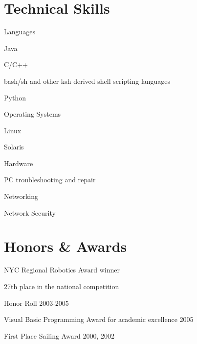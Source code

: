 \documentclass[margin,line]{resume}
\begin{document}
\begin{resume}
\section{\mysidestyle Technical Skills}
	\begin{compactdesc}
		\item[Languages] \ 
		\small
		\begin{compactitem}
			\item Java
			\item C/C++
			\item bash/sh and other ksh derived shell scripting languages
			\item Python
		\end{compactitem}
		\normalsize
		\item[Operating Systems] \ 
		\small
		\begin{compactitem}
			\item Linux
			\item Solaris
		\end{compactitem}
		\normalsize
		\item[Hardware] \ 
		\small
		\begin{compactitem}
			\item PC troubleshooting and repair
			\item Networking
			\item Network Security
		\end{compactitem}
		\normalsize
	\end{compactdesc}

\section{\mysidestyle Honors \& Awards}
	\begin{asparablank}
		\item NYC Regional Robotics Award winner
		\begin{compactitem}
			\item {\small 27th place in the national competition}
		\end{compactitem}
		\item Honor Roll 2003-2005
		\item Visual Basic Programming Award for academic excellence 2005
		\item First Place Sailing Award 2000, 2002
	\end{asparablank}


\end{resume}
\end{document}
